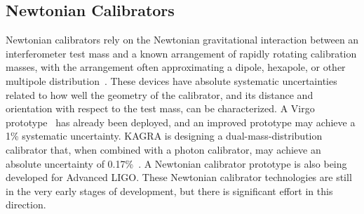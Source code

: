\subsection{Newtonian Calibrators}
Newtonian calibrators rely on the Newtonian gravitational interaction between an interferometer test mass and a known arrangement of rapidly rotating calibration masses, with the arrangement often approximating a dipole, hexapole, or other multipole distribution~\cite{Matone:2007vk,Inoue:2018okt}.
These devices have absolute systematic uncertainties related to how well the geometry of the calibrator, and its distance and orientation with respect to the test mass, can be characterized.
A Virgo prototype~\cite{0264-9381-35-23-235009} has already been deployed, and an improved prototype may achieve a 1\% systematic uncertainty.
\ac{KAGRA} is designing a dual-mass-distribution calibrator that, when combined with a photon calibrator, may achieve an absolute uncertainty of 0.17\%~\cite{PhysRevD.98.022005}.
A Newtonian calibrator prototype is also being developed for Advanced LIGO.
These Newtonian calibrator technologies are still in the very early stages of development, but there is significant effort in this direction.


